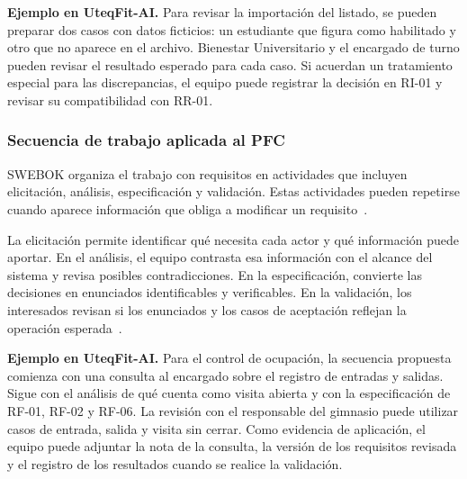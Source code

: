 \textbf{Ejemplo en UteqFit-AI.}
Para revisar la importación del listado, se pueden preparar dos
casos con datos ficticios: un estudiante que figura como habilitado
y otro que no aparece en el archivo. Bienestar Universitario y el
encargado de turno pueden revisar el resultado esperado para cada
caso. Si acuerdan un tratamiento especial para las discrepancias,
el equipo puede registrar la decisión en RI-01 y revisar su
compatibilidad con RR-01.

\subsubsection{Secuencia de trabajo aplicada al PFC}

SWEBOK organiza el trabajo con requisitos en actividades que incluyen
elicitación, análisis, especificación y validación. Estas actividades
pueden repetirse cuando aparece información que obliga a modificar
un requisito~\cite{swebok2024,ieee29148}.

La elicitación permite identificar qué necesita cada actor y qué
información puede aportar. En el análisis, el equipo contrasta esa
información con el alcance del sistema y revisa posibles
contradicciones. En la especificación, convierte las decisiones
en enunciados identificables y verificables. En la validación,
los interesados revisan si los enunciados y los casos de aceptación
reflejan la operación esperada~\cite{swebok2024,ieee29148}.

\textbf{Ejemplo en UteqFit-AI.}
Para el control de ocupación, la secuencia propuesta comienza
con una consulta al encargado sobre el registro de entradas y
salidas. Sigue con el análisis de qué cuenta como visita abierta
y con la especificación de RF-01, RF-02 y RF-06. La revisión
con el responsable del gimnasio puede utilizar casos de entrada,
salida y visita sin cerrar. Como evidencia de aplicación, el
equipo puede adjuntar la nota de la consulta, la versión de los
requisitos revisada y el registro de los resultados cuando se
realice la validación.